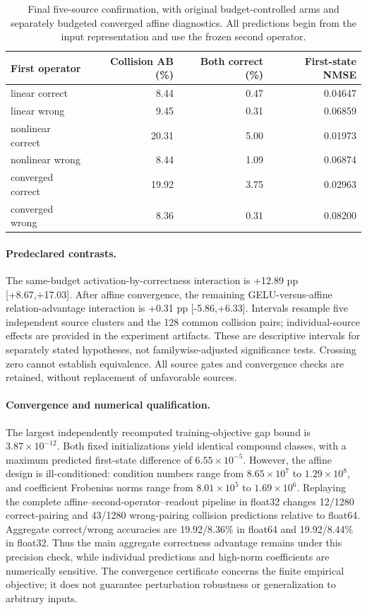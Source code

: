 \begin{table}[ht]\centering\small
\begin{tabular}{lrrr}\toprule First operator & Collision AB (\%) & Both correct (\%) & First-state NMSE\\\midrule
linear correct & 8.44 & 0.47 & 0.04647 \\
linear wrong & 9.45 & 0.31 & 0.06859 \\
nonlinear correct & 20.31 & 5.00 & 0.01973 \\
nonlinear wrong & 8.44 & 1.09 & 0.06874 \\
converged correct & 19.92 & 3.75 & 0.02963 \\
converged wrong & 8.36 & 0.31 & 0.08200 \\
\bottomrule\end{tabular}
\caption{Final five-source confirmation, with original budget-controlled arms and separately budgeted converged affine diagnostics. All predictions begin from the input representation and use the frozen second operator.}\end{table}

\paragraph{Predeclared contrasts.}
The same-budget activation-by-correctness interaction is +12.89 pp [+8.67,+17.03]. After affine convergence, the remaining GELU-versus-affine relation-advantage interaction is +0.31 pp [-5.86,+6.33]. Intervals resample five independent source clusters and the 128 common collision pairs; individual-source effects are provided in the experiment artifacts. These are descriptive intervals for separately stated hypotheses, not familywise-adjusted significance tests. Crossing zero cannot establish equivalence. All source gates and convergence checks are retained, without replacement of unfavorable sources.

\paragraph{Convergence and numerical qualification.}
The largest independently recomputed training-objective gap bound is $3.87\times10^{-12}$. Both fixed initializations yield identical compound classes, with a maximum predicted first-state difference of $6.55\times10^{-5}$. However, the affine design is ill-conditioned: condition numbers range from $8.65\times10^{7}$ to $1.29\times10^{8}$, and coefficient Frobenius norms range from $8.01\times10^{5}$ to $1.69\times10^{6}$. Replaying the complete affine--second-operator--readout pipeline in float32 changes 12/1280 correct-pairing and 43/1280 wrong-pairing collision predictions relative to float64. Aggregate correct/wrong accuracies are 19.92/8.36\% in float64 and 19.92/8.44\% in float32. Thus the main aggregate correctness advantage remains under this precision check, while individual predictions and high-norm coefficients are numerically sensitive. The convergence certificate concerns the finite empirical objective; it does not guarantee perturbation robustness or generalization to arbitrary inputs.

